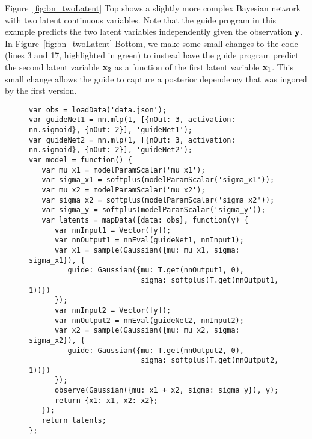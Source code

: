 Figure~\ref{fig:bn_twoLatent} Top shows a slightly more complex Bayesian network with two latent continuous variables. Note that the guide program in this example predicts the two latent variables independently given the observation $\vecstyle{y}$. In Figure~\ref{fig:bn_twoLatent} Bottom, we make some small changes to the code (lines 3 and 17, highlighted in green) to instead have the guide program predict the second latent variable $\vecstyle{x}_2$ as a function of the first latent variable $\vecstyle{x}_1$. This small change allows the guide to capture a posterior dependency that was ingored by the first version.


\begin{figure}

\begin{minipage}{\linewidth}
\begin{minipage}{0.66\linewidth}
\begin{lstlisting}[style=smaller]
var obs = loadData('data.json');
var guideNet1 = nn.mlp(1, [{nOut: 3, activation: nn.sigmoid}, {nOut: 2}], 'guideNet1');
var guideNet2 = nn.mlp(1, [{nOut: 3, activation: nn.sigmoid}, {nOut: 2}], 'guideNet2');
var model = function() {
   var mu_x1 = modelParamScalar('mu_x1');
   var sigma_x1 = softplus(modelParamScalar('sigma_x1'));
   var mu_x2 = modelParamScalar('mu_x2');
   var sigma_x2 = softplus(modelParamScalar('sigma_x2'));
   var sigma_y = softplus(modelParamScalar('sigma_y'));
   var latents = mapData({data: obs}, function(y) {
      var nnInput1 = Vector([y]);
      var nnOutput1 = nnEval(guideNet1, nnInput1);
      var x1 = sample(Gaussian({mu: mu_x1, sigma: sigma_x1}), {
         guide: Gaussian({mu: T.get(nnOutput1, 0),
                          sigma: softplus(T.get(nnOutput1, 1))})
      });
      var nnInput2 = Vector([y]);
      var nnOutput2 = nnEval(guideNet2, nnInput2);
      var x2 = sample(Gaussian({mu: mu_x2, sigma: sigma_x2}), {
         guide: Gaussian({mu: T.get(nnOutput2, 0),
                          sigma: softplus(T.get(nnOutput2, 1))})
      });
      observe(Gaussian({mu: x1 + x2, sigma: sigma_y}), y);
      return {x1: x1, x2: x2};
   });
   return latents;
};
\end{lstlisting}
\end{minipage}
%
\begin{minipage}{0.33\linewidth}
\begin{flushright}
\begin{tikzpicture}[scale=1, transform shape]

\end{tikzpicture}
\end{flushright}
\end{minipage}
\end{minipage}
\end{figure}
